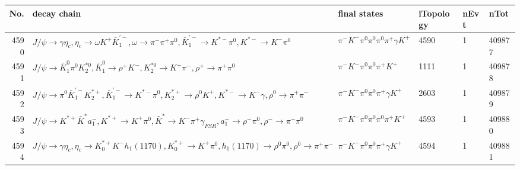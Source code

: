 \begin{table}[htbp] 
\begin{center}
\begin{small}
\begin{tabular}{rlllll}\hline\hline
 No. & decay chain & final states &  iTopology & nEvt & nTot \\\hline
4590&$J/\psi       \rightarrow \gamma       \eta_{c}    , \eta_{c}     \rightarrow \omega         K^{+}          \bar{K}_1^{'-}, \omega          \rightarrow \pi^{-}        \pi^{+}        \pi^{0}        , \bar{K}_1^{'-} \rightarrow K^{*-}         \pi^{0}        , K^{*-}          \rightarrow K^{-}          \pi^{0}        $&$\pi^{-}        K^{-}          \pi^{0}        \pi^{0}        \pi^{0}        \pi^{+}        \gamma       K^{+}          $& 4590&    1&409877\\
4591&$J/\psi       \rightarrow \bar{K}_1^{0} \pi^{0}        K_2^{*0}       , \bar{K}_1^{0}  \rightarrow \rho^{+}      K^{-}          , K_2^{*0}        \rightarrow K^{+}          \pi^{-}        , \rho^{+}       \rightarrow \pi^{+}        \pi^{0}        $&$\pi^{-}        K^{-}          \pi^{0}        \pi^{0}        \pi^{+}        K^{+}          $& 1111&    1&409878\\
4592&$J/\psi       \rightarrow \pi^{0}        \bar{K}_1^{'-}K_2^{*+}       , \bar{K}_1^{'-} \rightarrow K^{*-}         \pi^{0}        , K_2^{*+}        \rightarrow \rho^{0}      K^{+}          , K^{*-}          \rightarrow K^{-}          \gamma       , \rho^{0}       \rightarrow \pi^{+}        \pi^{-}        $&$\pi^{-}        K^{-}          \pi^{0}        \pi^{0}        \pi^{+}        \gamma       K^{+}          $& 2603&    1&409879\\
4593&$J/\psi       \rightarrow K^{*+}         \bar{K}^{*}   a_{1}^{-}      , K^{*+}          \rightarrow K^{+}          \pi^{0}        , \bar{K}^{*}    \rightarrow K^{-}          \pi^{+}        \gamma_{FSR} , a_{1}^{-}       \rightarrow \rho^{-}      \pi^{0}        , \rho^{-}       \rightarrow \pi^{-}        \pi^{0}        $&$\pi^{-}        K^{-}          \pi^{0}        \pi^{0}        \pi^{0}        \pi^{+}        K^{+}          $& 4593&    1&409880\\
4594&$J/\psi       \rightarrow \gamma       \eta_{c}    , \eta_{c}     \rightarrow K_{0}^{*+}     K^{-}          h_{1}(1170)    , K_{0}^{*+}      \rightarrow K^{+}          \pi^{0}        , h_{1}(1170)     \rightarrow \rho^{0}      \pi^{0}        , \rho^{0}       \rightarrow \pi^{+}        \pi^{-}        $&$\pi^{-}        K^{-}          \pi^{0}        \pi^{0}        \pi^{+}        \gamma       K^{+}          $& 4594&    1&409881\\

\end{tabular}
\end{small}
\end{center}
\end{table}
